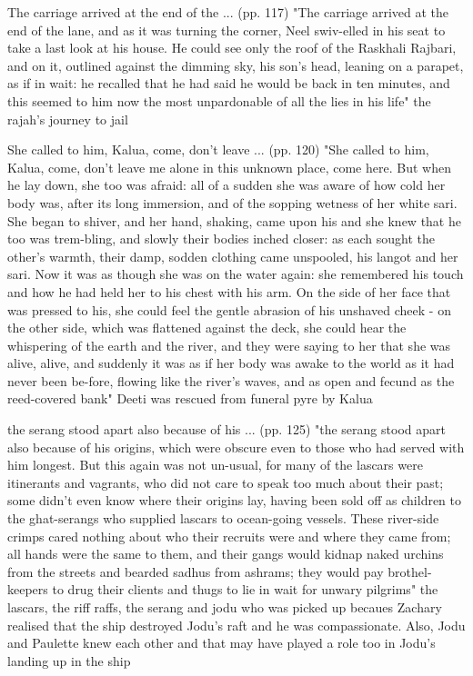 The carriage arrived at the end of the ... (pp. 117)
"The carriage arrived at the end of the lane, and as it was turning the corner, Neel swiv-elled in his seat to take a last look at his house. He could see only the roof of the Raskhali Rajbari, and on it, outlined against the dimming sky, his son’s head, leaning on a parapet, as if in wait: he recalled that he had said he would be back in ten minutes, and this seemed to him now the most unpardonable of all the lies in his life"
the rajah's journey to jail

She called to him, Kalua, come, don’t leave ... (pp. 120)
"She called to him, Kalua, come, don’t leave me alone in this unknown place, come here. But when he lay down, she too was afraid: all of a sudden she was aware of how cold her body was, after its long immersion, and of the sopping wetness of her white sari. She began to shiver, and her hand, shaking, came upon his and she knew that he too was trem-bling, and slowly their bodies inched closer: as each sought the other’s warmth, their damp, sodden clothing came unspooled, his langot and her sari. Now it was as though she was on the water again: she remembered his touch and how he had held her to his chest with his arm. On the side of her face that was pressed to his, she could feel the gentle abrasion of his unshaved cheek - on the other side, which was flattened against the deck, she could hear the whispering of the earth and the river, and they were saying to her that she was alive, alive, and suddenly it was as if her body was awake to the world as it had never been be-fore, flowing like the river’s waves, and as open and fecund as the reed-covered bank"
Deeti was rescued from funeral pyre by Kalua

the serang stood apart also because of his ... (pp. 125)
"the serang stood apart also because of his origins, which were obscure even to those who had served with him longest. But this again was not un-usual, for many of the lascars were itinerants and vagrants, who did not care to speak too much about their past; some didn’t even know where their origins lay, having been sold off as children to the ghat-serangs who supplied lascars to ocean-going vessels. These river-side crimps cared nothing about who their recruits were and where they came from; all hands were the same to them, and their gangs would kidnap naked urchins from the streets and bearded sadhus from ashrams; they would pay brothel-keepers to drug their clients and thugs to lie in wait for unwary pilgrims"
the lascars, the riff raffs, the serang and jodu who was picked up becaues Zachary realised that the ship destroyed Jodu's raft and he was compassionate. Also, Jodu and Paulette knew each other and that may have played a role too in Jodu's landing up in the ship

